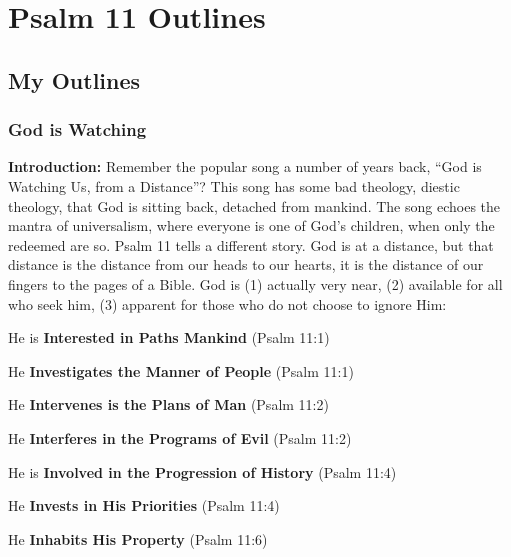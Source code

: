 \section{Psalm 11 Outlines}

\subsection{My Outlines}

\subsubsection{God is Watching}
\textbf{Introduction: }Remember the popular song a number of years back, ``God is Watching Us, from a Distance''? This song has some bad theology, diestic theology, that God is sitting back, detached from mankind. The song echoes the mantra of universalism, where everyone is one of God's children, when only the redeemed are so. Psalm 11 tells a different story. God is at a distance, but that distance is the distance from our heads to our hearts, it is the distance of our fingers to the pages of a Bible.  God is (1) actually very near, (2) available for all who seek him, (3) apparent for those who do not choose to ignore Him:%
\begin{compactenum}[I.]
    \item He is \textbf{Interested in Paths Mankind} (Psalm 11:1)
    \item He \textbf{Investigates the Manner of People} (Psalm 11:1)
    \item He \textbf{Intervenes is the Plans of Man} (Psalm 11:2)
    \item He \textbf{Interferes in the Programs of Evil} (Psalm 11:2)
    \item He is \textbf{Involved in the Progression of History} (Psalm 11:4)
    \item He \textbf{Invests in His Priorities}  (Psalm 11:4)
    \item He \textbf{Inhabits His Property} (Psalm 11:6)
\end{compactenum}


